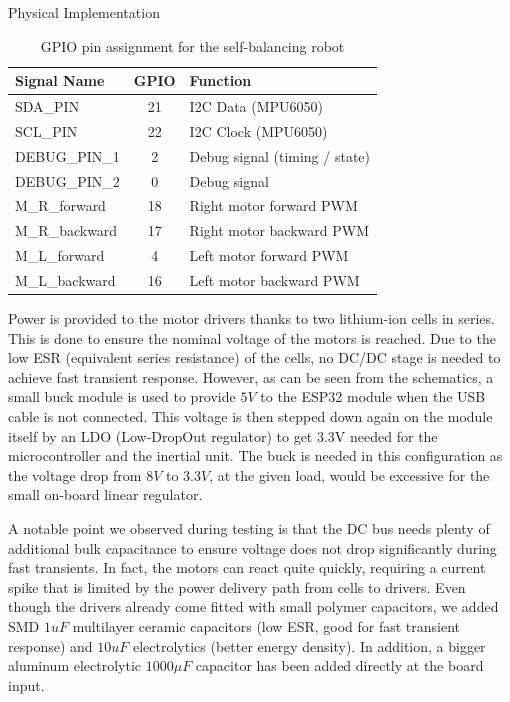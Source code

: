 \begin{chapter}{Physical Implementation}
\begin{table}[h]
    \centering
    \begin{tabular}{|l|c|l|}
    \hline
    \textbf{Signal Name} & \textbf{GPIO} & \textbf{Function} \\
    \hline
    SDA\_PIN        & 21 & I2C Data (MPU6050) \\
    SCL\_PIN        & 22 & I2C Clock (MPU6050) \\
    \hline
    DEBUG\_PIN\_1  & 2  & Debug signal (timing / state) \\
    DEBUG\_PIN\_2  & 0  & Debug signal \\
    \hline
    M\_R\_forward  & 18 & Right motor forward PWM \\
    M\_R\_backward & 17 & Right motor backward PWM \\
    M\_L\_forward  & 4  & Left motor forward PWM \\
    M\_L\_backward & 16 & Left motor backward PWM \\
    \hline
    \end{tabular}
    \caption{GPIO pin assignment for the self-balancing robot}
    \label{tab:04_pin_assignment}
\end{table}

Power is provided to the motor drivers thanks to two lithium-ion cells in series. This is done to ensure the nominal voltage of the motors is reached.
Due to the low ESR (equivalent series resistance) of the cells, no DC/DC stage is needed to achieve fast transient response. 
However, as can be seen from the schematics, a small buck module is used to provide $5 V$ to the ESP32 module when the USB cable is not connected. This voltage is then stepped down again on the module itself by an LDO (Low-DropOut regulator) to get 3.3V needed for the microcontroller and the inertial unit.
The buck is needed in this configuration as the voltage drop from $8V$ to $3.3V$, at the given load, would be excessive for the small on-board linear regulator.

A notable point we observed during testing is that the DC bus needs plenty of additional bulk capacitance to ensure voltage does not drop significantly during fast transients. In fact, the motors can react quite quickly, requiring a current spike that is limited by the power delivery path from cells to drivers.
Even though the drivers already come fitted with small polymer capacitors, we added SMD $1 uF$ multilayer ceramic capacitors (low ESR, good for fast transient response) and $10 uF$ electrolytics (better energy density). In addition, a bigger aluminum electrolytic $1000 \mu F$ capacitor has been added directly at the board input.


\end{chapter}

